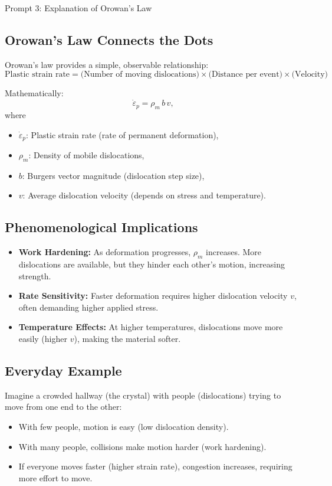 \documentclass[12pt]{article}
\begin{document}
\begin{summary}{Prompt 3: Explanation of Orowan's Law}
\subsection*{Orowan’s Law Connects the Dots}
Orowan’s law provides a simple, observable relationship:
\[
\text{Plastic strain rate} = 
\text{(Number of moving dislocations)} \times
\text{(Distance per event)} \times
\text{(Velocity)}
\]

Mathematically:
\begin{equation}
  \dot{\varepsilon}_p = \rho_m \, b \, v ,
\end{equation}
where
\begin{itemize}
  \item $\dot{\varepsilon}_p$: Plastic strain rate (rate of permanent deformation),
  \item $\rho_m$: Density of mobile dislocations,
  \item $b$: Burgers vector magnitude (dislocation step size),
  \item $v$: Average dislocation velocity (depends on stress and temperature).
\end{itemize}

\subsection*{Phenomenological Implications}
\begin{itemize}
  \item \textbf{Work Hardening:} As deformation progresses, $\rho_m$ increases.
  More dislocations are available, but they hinder each other’s motion,
  increasing strength.
  \item \textbf{Rate Sensitivity:} Faster deformation requires higher
  dislocation velocity $v$, often demanding higher applied stress.
  \item \textbf{Temperature Effects:} At higher temperatures, dislocations move
  more easily (higher $v$), making the material softer.
\end{itemize}

\subsection*{Everyday Example}
Imagine a crowded hallway (the crystal) with people (dislocations) trying to
move from one end to the other:
\begin{itemize}
  \item With few people, motion is easy (low dislocation density).
  \item With many people, collisions make motion harder (work hardening).
  \item If everyone moves faster (higher strain rate), congestion increases,
  requiring more effort to move.
\end{itemize}
\end{summary}
\end{document}
